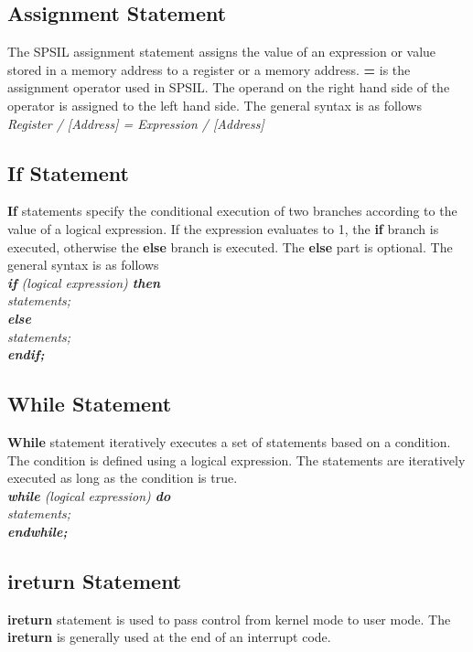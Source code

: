 \documentclass[11pt]{article}
\begin{document}
\subsection{Assignment Statement}
The SPSIL assignment statement assigns the value of an  expression or value stored in a memory address to a register or a memory address. \textbf{=} is the assignment operator used in SPSIL. The operand on the right hand side of the operator is assigned to the left hand side. The general syntax is as follows \\

\indent \textit{ Register / [Address] = Expression / [Address] }


\subsection{If Statement}
\textbf{If} statements specify the conditional execution of two branches according to the value of a logical expression. If the expression evaluates to 1, the \textbf{if} branch is executed, otherwise the \textbf{else}  branch is executed. The \textbf{else} part is optional. The general syntax is as follows  \\

\textit{
\textbf{if} (logical expression) \textbf{then}  \\
 \indent \indent statements; \\
\indent \textbf{else} \\
\indent  \indent statements; \\
\indent \textbf{endif;}  \\
}



\subsection{While Statement}
\textbf{While} statement iteratively executes a set of statements based on a condition. The condition is defined using a logical expression.  The statements are iteratively executed as long as the condition is true.\\

\textit{
\textbf{while} (logical expression) \textbf{do}  \\
 \indent \indent statements; \\
\indent \textbf{endwhile;}  \\
}


\subsection{ireturn Statement}
\textbf{ireturn} statement is used to pass control from kernel mode to user mode. The \textbf{ireturn} is generally used at the end of an interrupt code.
\end{document}
